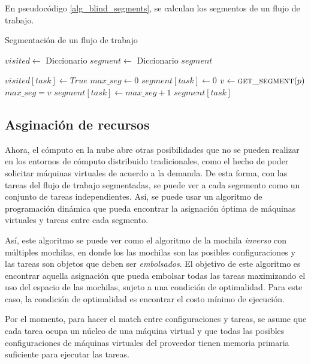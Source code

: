 En pseudocódigo \ref{alg_blind_segments}, se calculan los segmentos de un flujo de trabajo.

\begin{algorithm}
\caption{Segmentación de un flujo de trabajo}
\label{alg_blind_segments}
\begin{algorithmic}[1]
	\State $visited \gets$ Diccionario
	\State $segment \gets$ Diccionario
		\State {}
	\EndFor
	\State \Return $segment$
\EndProcedure

	\State $visited[task] \gets True$
	\State $max\_seg \gets 0$
		\State $segment[task] \gets 0$
			\State $v \gets \Call{get\_segment}{p}$
				\State $max\_seg = v$
			\EndIf
		\EndFor
		\State $segment[task] \gets max\_seg + 1$
	\EndIf
	\State \Return $segment[task]$
\EndProcedure
\end{algorithmic}
\end{algorithm}

\subsection{Asginación de recursos}

Ahora, el cómputo en la nube abre otras posibilidades que no se pueden realizar en los entornos de cómputo distribuido tradicionales, como el hecho de poder solicitar máquinas virtuales de acuerdo a la demanda. De esta forma, con las tareas del flujo de trabajo segmentadas, se puede ver a cada segemento como un conjunto de tareas independientes. Así, se puede usar un algoritmo de programación dinámica que pueda encontrar la asignación óptima de máquinas virtuales y tareas entre cada segmento.

Así, este algoritmo se puede ver como el algoritmo de la mochila \emph{inverso} con múltiples mochilas, en donde los las mochilas son las posibles configuraciones y las tareas son objetos que deben ser \emph{embolsados}. El objetivo de este algoritmo es encontrar aquella asignación que pueda embolsar todas las tareas maximizando el uso del espacio de las mochilas, sujeto a una condición de optimalidad. Para este caso, la condición de optimalidad es encontrar el costo mínimo de ejecución.

Por el momento, para hacer el match entre configuraciones y tareas, se asume que cada tarea ocupa un núcleo de una máquina virtual y que todas las posibles configuraciones de máquinas virtuales del proveedor tienen memoria primaria suficiente para ejecutar las tareas.

